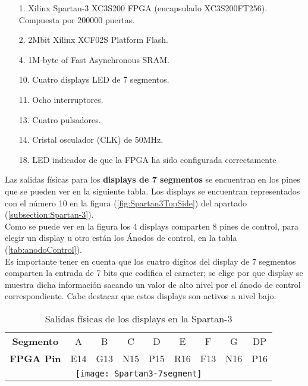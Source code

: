     \begin{itemize}
        \item [1.] Xilinx Spartan-3 XC3S200 FPGA  (encapsulado XC3S200FT256). Compuesta por 200000 puertas.
        \item [2.] 2Mbit Xilinx XCF02S Platform Flash.
        \item [4.] 1M-byte of Fast Asynchronous SRAM.
        \item [10.] Cuatro displays LED de 7 segmentos.
        \item [11.] Ocho interruptores.
        \item [13.] Cuatro pulsadores.
        \item [14.] Cristal osculador (CLK) de 50MHz.
        \item [18.] LED indicador de que la FPGA ha sido configurada correctamente

    \end{itemize}

    Las salidas físicas para los \textbf{displays de 7 segmentos} se encuentran en los pines que se pueden ver en la siguiente tabla. Los displays se encuentran representados con el número 10 en la figura (\ref{fig:Spartan3TopSide}) del apartado (\ref{subsection:Spartan-3}). \\ 

    Como se puede ver en la figura los 4 displays comparten 8 pines de control, para elegir un display u otro están los Ánodos de control, en la tabla (\ref{tab:anodoControl}). \\ 

    Es importante tener en cuenta que los cuatro digitos del display de 7 segmentos comparten la entrada de 7 bits que codifica el caracter; se elige por que display se muestra dicha información sacando un valor de alto nivel por el ánodo de control correspondiente. Cabe destacar que estos displays son activos a nivel bajo. \\ 

    \begin{table}[H]
            \centering
            \begin{tabular}{|c|c|c|c|c|c|c|c|c|}
                \hline
                \rowcolor[rgb]{0.21,0.69,0.87}\multicolumn{9}{|c|}{  \textbf{ {Salidas físicas Display 7 segmentos}}} \\
                \hline \hline
                \textbf{  Segmento  } & A & B & C & D & E & F & G & DP \\ 
                \hline
                \textbf{  FPGA Pin  }  & E14 & G13 & N15 & P15 & R16 & F13 & N16 & P16 \\ 
                \hline
                \multicolumn{9}{|c|}{\texttt{[image: Spartan3-7segment]}}\\
                \hline
                 
            \end{tabular}
        \caption{ Salidas físicas de los displays en la Spartan-3 }
        \label{tab:tablaSalidas7Segmentos}
    \end{table}

